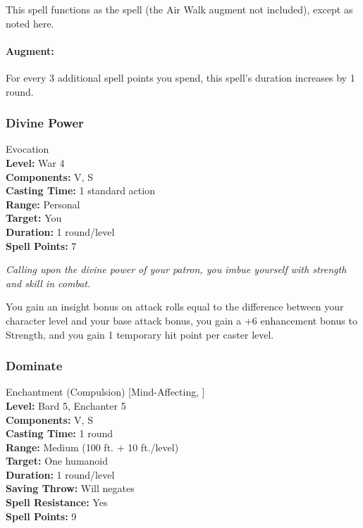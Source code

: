 This spell functions as the  spell (the Air Walk augment not included), except as noted here.

\paragraph{Augment:} For every 3 additional spell points you spend, this spell's duration increases by 1 round.

\subsubsection{Divine Power}
\label{Spell:DivinePower}
Evocation
\\ \textbf{Level:} War 4
\\ \textbf{Components:} V, S
\\ \textbf{Casting Time:} 1 standard action
\\ \textbf{Range:} Personal
\\ \textbf{Target:} You
\\ \textbf{Duration:} 1 round/level
\\ \textbf{Spell Points:} 7

\emph{Calling upon the divine power of your patron, you imbue yourself with strength and skill in combat.}

You gain an insight bonus on attack rolls equal to the difference between your character level and your base attack bonus, you gain a +6 enhancement bonus to Strength, and you gain 1 temporary hit point per caster level.
\subsubsection{Dominate}
\label{Spell:Dominate}
Enchantment (Compulsion) [Mind-Affecting, ]
\\ \textbf{Level:} Bard 5, Enchanter 5
\\ \textbf{Components:} V, S
\\ \textbf{Casting Time:} 1 round
\\ \textbf{Range:} Medium (100 ft. + 10 ft./level)
\\ \textbf{Target:} One humanoid
\\ \textbf{Duration:} 1 round/level
\\ \textbf{Saving Throw:} Will negates
\\ \textbf{Spell Resistance:} Yes
\\ \textbf{Spell Points:} 9

